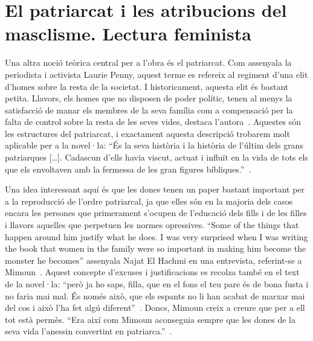 \section{El patriarcat i les atribucions del masclisme. Lectura feminista}

\begin{comment}
  1) autoidentificació
  buscant la seva identitat
  * religió
  * literatura

  2) les atribucions
  * com han de ser les nenes/les dones?
    ** alleine fuer die ganze care arbeit zustaendig, wird als natuerliche neigung inszeniert
  * les dones i les "altres" són culpables per tot (vgl Laurie Penny)
    --> keine Solidaritaet zwischen den Frauen (zb la mare i les amants) moeglich, obwohl sie alle Opfer sind; sie werden gegen einander ausgespielt
  * frauen werden auf ihr aeusseres reduziert
  * die frauen wuerden nie genuegen;
\end{comment}

Una altra noció teòrica central per a l'obra és el patriarcat.
Com assenyala la periodista i activista Laurie Penny, aquest terme es refereix al regiment d'una elit d'homes sobre la resta de la societat.
I historicament, aquesta elit és bastant petita.
Llavors, els homes que no disposen de poder polític, tenen al menys la satisfacció de manar els membres de la seva família com a compensació per la falta de control sobre la resta de les seves vides, destaca l'autora~\autocite[69-70]{Penny2014}.
Aquestes són les estructures del patriarcat, i exactament aquesta descripció trobarem molt aplicable per a la novel·la:
``És la seva història i la història de l'últim dels grans patriarques [\ldots]. Cadascun d'ells havia viscut, actuat i influït en la vida de tots els que els envoltaven amb la fermessa de les gran figures bíbliques.''~\autocite[7]{ElHachmi2008}.

Una idea interessant aquí és que les dones tenen un paper bastant important per a la reproducció de l'ordre patriarcal, ja que elles són en la majoria dels casos encara les persones que primerament s'ocupen de l'educació dels fills i de les filles i llavors aquelles que perpetuen les normes opressives.
``Some of the things that happen around him justify what he does. I was very surprised when I was writing the book that women in the family were so important in making him become the monster he becomes'' assenyala Najat El Hachmi en una entrevista, referint-se a Mimoun~\autocite{HaAM2011}.
Aquest concepte d'excuses i justificacions es recolza també en el text de la novel·la: ``però ja ho saps, filla, que en el fons el teu pare és de bona fusta i no faria mai mal. És només això, que els espants no li han acabat de marxar mai del cos i això l'ha fet algú diferent''~\autocite[18]{ElHachmi2008}.
Doncs, Mimoun creix a creure que per a ell tot està permès.
``Era així com Mimoun aconseguia sempre que les dones de la seva vida l'anessin convertint en patriarca.''~\autocite[99]{ElHachmi2008}.

